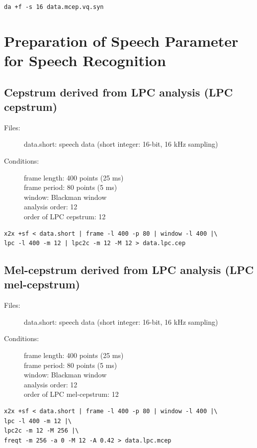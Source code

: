 \documentclass[a4paper,10pt]{article}
\begin{document}
\begin{verbatim}
da +f -s 16 data.mcep.vq.syn
\end{verbatim}

\section{Preparation of Speech Parameter for Speech Recognition}

\subsection{Cepstrum derived from LPC analysis (LPC cepstrum)}

\begin{description}
\item[Files:] 
  data.short: speech data (short integer: 16-bit, 16 kHz sampling)
\item[Conditions:]
  frame length: 400 points (25 ms)\\
  frame period: 80 points (5 ms)\\
  window: Blackman window\\
  analysis order: 12\\
  order of LPC cepstrum: 12
\end{description}

\begin{verbatim}
x2x +sf < data.short | frame -l 400 -p 80 | window -l 400 |\
lpc -l 400 -m 12 | lpc2c -m 12 -M 12 > data.lpc.cep
\end{verbatim}

\subsection{Mel-cepstrum derived from LPC analysis
  (LPC mel-cepstrum)}

\begin{description}
\item[Files:]
  data.short: speech data (short integer: 16-bit, 16 kHz sampling)
\item[Conditions:]
  frame length: 400 points (25 ms)\\
  frame period: 80 points (5 ms)\\
  window: Blackman window\\
  analysis order: 12\\
  order of LPC mel-cepstrum: 12
\end{description}

\begin{verbatim}
x2x +sf < data.short | frame -l 400 -p 80 | window -l 400 |\
lpc -l 400 -m 12 |\
lpc2c -m 12 -M 256 |\
freqt -m 256 -a 0 -M 12 -A 0.42 > data.lpc.mcep
\end{verbatim}
\end{document}
